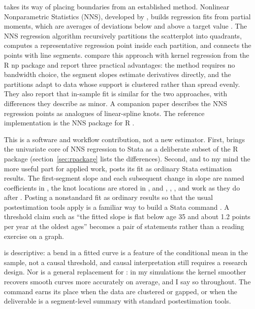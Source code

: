  takes its way of placing boundaries from an established
method.  Nonlinear Nonparametric Statistics (NNS), developed by
\citet{viole_nawrocki_2013}, builds regression fits from partial moments,
which are averages of deviations below and above a target value
\citep{viole_nawrocki_2012_cdf,viole_nawrocki_2012_corr,nawrocki_viole_2024}.
The NNS regression
algorithm recursively partitions the scatterplot into quadrants, computes a
representative regression point inside each partition, and connects the
points with line segments.  \citet{vinod_viole_2018_clusters} compare this
approach with kernel regression from the R np package
\citep{hayfield_racine_2008} and report three practical advantages: the
method requires no bandwidth choice, the segment slopes estimate derivatives
directly, and the partitions adapt to data whose support is clustered rather
than spread evenly.  They also report that in-sample fit is similar for the
two approaches, with differences they describe as minor.  A companion paper
\citep{vinod_viole_2018_segments} describes the NNS regression points as
analogues of linear-spline knots.  The reference implementation is the NNS
package for R \citep{viole_2026_nns}.

This is a software and workflow contribution, not a new estimator.  First,
 brings the univariate core of NNS regression to Stata as a
deliberate subset of the R package (section~\ref{sec:rpackage} lists the
differences).  Second, and to my mind the more useful part for applied work,
 posts its fit as ordinary Stata estimation results.  The
first-segment slope and each subsequent change in slope are named coefficients
in , the knot locations are stored in , and
, , , and 
\citep{jann_2014} work as they do after .  Posting a
nonstandard fit as ordinary results so that the usual postestimation tools
apply is a familiar way to build a Stata command \citep{newson_2006}.  A
threshold claim such as ``the fitted slope is flat below age 35 and about 1.2
points per year at the oldest ages'' becomes a pair of 
statements rather than a reading exercise on a graph.

 is descriptive: a bend in a
fitted curve is a feature of the conditional mean in the sample, not a causal
threshold, and causal interpretation still requires a research design.  Nor
is  a general replacement for : in
my simulations the kernel smoother recovers smooth curves more accurately on
average, and I say so throughout.  The command earns its place when the
data are clustered or gapped, or when the deliverable is a segment-level
summary with standard postestimation tools.

